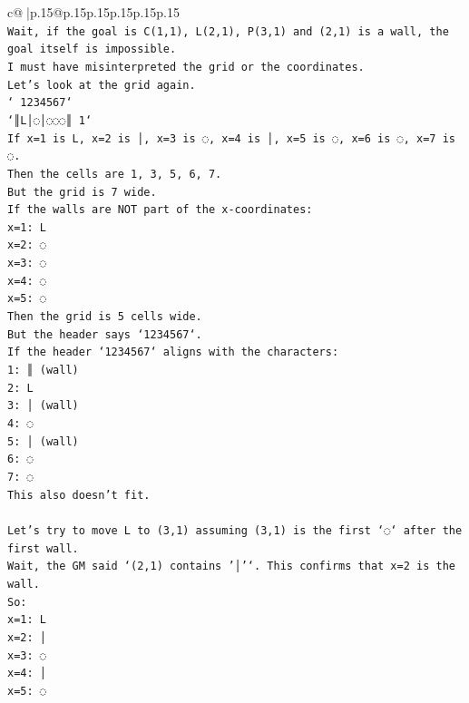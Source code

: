 \documentclass{article}
\begin{document}
{\begin{supertabular}{c@{$\;$}|p{.15\linewidth}@{}p{.15\linewidth}p{.15\linewidth}p{.15\linewidth}p{.15\linewidth}p{.15\linewidth}}
{{{\\ 
\texttt{Wait, if the goal is C(1,1), L(2,1), P(3,1) and (2,1) is a wall, the goal itself is impossible.} \\
\texttt{I must have misinterpreted the grid or the coordinates.} \\
\texttt{Let's look at the grid again.} \\
\texttt{` 1234567`} \\
\texttt{`║L│◌│◌◌◌║ 1`} \\
\texttt{If x=1 is L, x=2 is │, x=3 is ◌, x=4 is │, x=5 is ◌, x=6 is ◌, x=7 is ◌.} \\
\texttt{Then the cells are 1, 3, 5, 6, 7.} \\
\texttt{But the grid is 7 wide.} \\
\texttt{If the walls are NOT part of the x{-}coordinates:} \\
\texttt{x=1: L} \\
\texttt{x=2: ◌} \\
\texttt{x=3: ◌} \\
\texttt{x=4: ◌} \\
\texttt{x=5: ◌} \\
\texttt{Then the grid is 5 cells wide.} \\
\texttt{But the header says `1234567`.} \\
\texttt{If the header `1234567` aligns with the characters:} \\
\texttt{1: ║ (wall)} \\
\texttt{2: L} \\
\texttt{3: │ (wall)} \\
\texttt{4: ◌} \\
\texttt{5: │ (wall)} \\
\texttt{6: ◌} \\
\texttt{7: ◌} \\
\texttt{This also doesn't fit.} \\
\\ 
\texttt{Let's try to move L to (3,1) assuming (3,1) is the first `◌` after the first wall.} \\
\texttt{Wait, the GM said `(2,1) contains '│'`. This confirms that x=2 is the wall.} \\
\texttt{So:} \\
\texttt{x=1: L} \\
\texttt{x=2: │} \\
\texttt{x=3: ◌} \\
\texttt{x=4: │} \\
\texttt{x=5: ◌} \\
}}}
\end{supertabular}}
\end{document}
